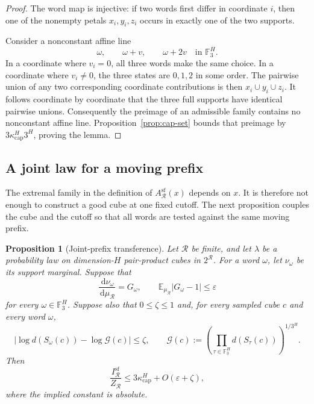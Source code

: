 \documentclass[11pt]{article}
\numberwithin{equation}{section}
\theoremstyle{plain}
\newtheorem{proposition}[theorem]{Proposition}
\newcommand{\F}{\mathbb F}
\newcommand{\E}{\mathbb E}
\newcommand{\1}{\mathbf 1}
\newcommand{\dd}{\,\mathrm d}
\newcommand{\eps}{\varepsilon}
\newcommand{\cR}{\mathcal R}
\newcommand{\kappacap}{\kappa_{\mathrm{cap}}}
\begin{document}
\begin{proof}
The word map is injective: if two words first differ in coordinate $i$,
then one of the nonempty petals $x_i,y_i,z_i$ occurs in exactly one of the
two supports.

Consider a nonconstant affine line
\[
 \omega,\qquad \omega+v,\qquad \omega+2v
 \quad\text{in }\F_3^H.
\]
In a coordinate where $v_i=0$, all three words make the same choice.  In a
coordinate where $v_i\ne0$, the three states are $0,1,2$ in some order.
The pairwise union of any two corresponding coordinate contributions is
then $x_i\cup y_i\cup z_i$.  It follows coordinate by coordinate that the
three full supports have identical pairwise unions.  Consequently the
preimage of an admissible family contains no nonconstant affine line.
Proposition~\ref{prop:cap-set} bounds that preimage by
$3\kappacap^H3^H$, proving the lemma.
\end{proof}

\subsection{A joint law for a moving prefix}

The extremal family in the definition of
$A_{\cR}^{\mathrm{sf}}(x)$ depends on $x$.  It is therefore not enough to
construct a good cube at one fixed cutoff.  The next proposition couples
the cube and the cutoff so that all words are tested against the same
moving prefix.

\begin{proposition}[Joint-prefix transference]\label{prop:joint-prefix}
Let $\cR$ be finite, and let $\lambda$ be a probability law on
dimension-$H$ pair-product cubes in $2^{\cR}$.  For a word $\omega$, let
$\nu_\omega$ be its support marginal.  Suppose that
\begin{equation}\label{eq:word-density}
 \frac{\dd\nu_\omega}{\dd\mu_{\cR}}=G_\omega,
 \qquad
 \E_{\mu_{\cR}}|G_\omega-1|\le\eps
\end{equation}
for every $\omega\in\F_3^H$.  Suppose also that $0\le\zeta\le1$ and, for
every sampled cube $c$ and every word $\omega$,
\begin{equation}\label{eq:log-balance}
 \left|\log d(S_\omega(c))-\log\mathcal G(c)\right|\le\zeta,
 \qquad
 \mathcal G(c):=
 \left(\prod_{\tau\in\F_3^H}d(S_\tau(c))\right)^{1/3^H}.
\end{equation}
Then
\begin{equation}\label{eq:joint-prefix-bound}
 \frac{I_{\cR}^{\mathrm{sf}}}{Z_{\cR}}
 \le 3\kappacap^H+O(\eps+\zeta),
\end{equation}
where the implied constant is absolute.
\end{proposition}
\end{document}
